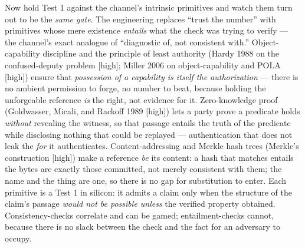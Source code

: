 \documentclass[11pt]{article}
\begin{document}
Now hold Test 1 against the channel's intrinsic primitives and watch them turn out to be the \emph{same gate}. The engineering replaces ``trust the number'' with primitives whose mere existence \emph{entails} what the check was trying to verify — the channel's exact analogue of ``diagnostic of, not consistent with.'' Object-capability discipline and the principle of least authority (Hardy 1988 on the confused-deputy problem [high]; Miller 2006 on object-capability and POLA [high]) ensure that \emph{possession of a capability is itself the authorization} — there is no ambient permission to forge, no number to beat, because holding the unforgeable reference \emph{is} the right, not evidence for it. Zero-knowledge proof (Goldwasser, Micali, and Rackoff 1989 [high]) lets a party prove a predicate holds \emph{without} revealing the witness, so that passage entails the truth of the predicate while disclosing nothing that could be replayed — authentication that does not leak the \emph{for} it authenticates. Content-addressing and Merkle hash trees (Merkle's construction [high]) make a reference \emph{be} its content: a hash that matches entails the bytes are exactly those committed, not merely consistent with them; the name and the thing are one, so there is no gap for substitution to enter. Each primitive is a Test 1 in silicon: it admits a claim only when the structure of the claim's passage \emph{would not be possible unless} the verified property obtained. Consistency-checks correlate and can be gamed; entailment-checks cannot, because there is no slack between the check and the fact for an adversary to occupy.
\end{document}
